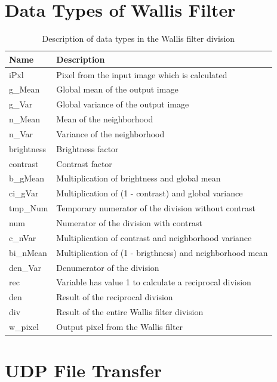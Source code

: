 \section{Data Types of Wallis Filter} \label{app:datatypes}
\begin{table}[H]
    \centering
    \begin{tabularx}{\textwidth}{l l}
        \toprule
        Name & Description \\
        \midrule
        iPxl & 			Pixel from the input image which is calculated \\
        g\_Mean &  		Global mean of the output image \\
        g\_Var &  		Global variance of the output image \\
        n\_Mean &		Mean of the neighborhood \\
        n\_Var &  		Variance of the neighborhood \\
        brightness & 	Brightness factor \\
        contrast & 		Contrast factor \\
        b\_gMean &  	Multiplication of brightness and global mean\\
        ci\_gVar &  	Multiplication of (1 - contrast) and global variance\\
        tmp\_Num &  	Temporary numerator of the division without contrast\\
        num &   		Numerator of the division with contrast\\
        c\_nVar &  		Multiplication of contrast and neighborhood variance\\
        bi\_nMean &  	Multiplication of (1 - brigthness) and neighborhood mean\\
        den\_Var & 		Denumerator of the division \\
        rec & 			Variable has value 1 to calculate a reciprocal division\\
        den & 			Result of the reciprocal division\\
        div &  			Result of the entire Wallis filter division\\
        w\_pixel &  	Output pixel from the Wallis filter\\
        \bottomrule
    \end{tabularx}
    \caption{Description of data types in the Wallis filter division}
\end{table}

\clearpage

\section{UDP File Transfer} \label{app:uftspec}



